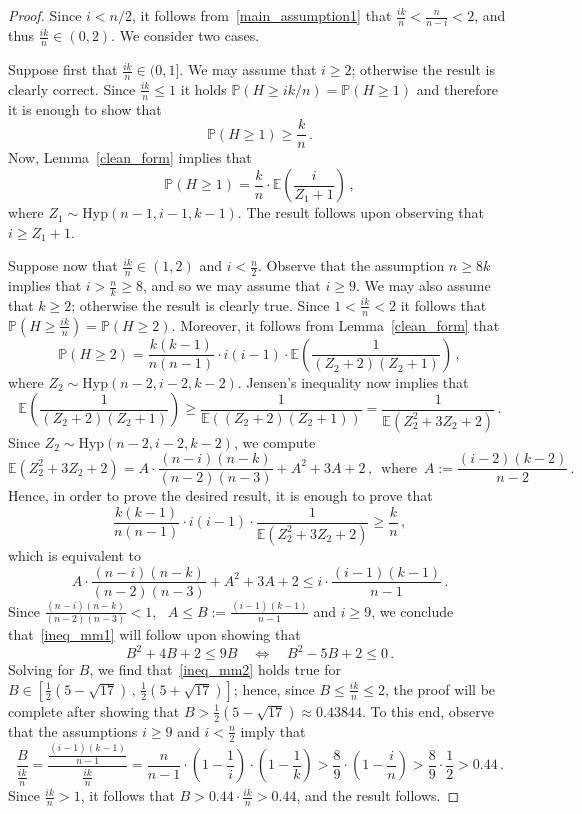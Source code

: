 \documentclass[10pt,a4paper]{amsart}
\begin{document}
\begin{proof}
Since $i<n/2$, it follows from~\eqref{main_assumption1}  that $\frac{ik}{n} < \frac{n}{n-i} < 2$, and thus $\frac{ik}{n}\in (0,2)$. 
We consider two cases. 

Suppose first that $\frac{ik}{n} \in (0,1]$.  
We may assume that $i\ge 2$; otherwise the result is clearly correct. 
Since $\frac{ik}{n} \le 1$ it holds $\mathbb{P}(H \ge ik/n) =\mathbb{P}(H \ge 1)$ 
and therefore it is enough to show that
\[
\mathbb{P}(H\ge 1)\ge \frac{k}{n} \, .
\] 
Now, Lemma~\ref{clean_form} implies that 
\[
\mathbb{P}(H\ge 1)=\frac{k}{n} \cdot \mathbb{E}\left(\frac{i}{Z_1 + 1}\right)   \, , 
\]
where $Z_1\sim\text{Hyp}(n-1,i-1,k-1)$.   The result follows upon observing that $i\ge Z_1+1$. 

Suppose now that $\frac{ik}{n} \in (1,2)$ and $i<\frac{n}{2}$. 
Observe that the assumption $n\ge 8k$ implies that $i> \frac{n}{k} \ge 8$, and so we may assume that $i\ge 9$. 
We may also assume that $k\ge 2$; otherwise the result is clearly true. 
Since $1<\frac{ik}{n} < 2$ it follows that 
$\mathbb{P}(H \ge \frac{ik}{n})=\mathbb{P}(H\ge 2)$. 
Moreover, it follows from Lemma~\ref{clean_form} that 
\[
\mathbb{P}(H\ge 2) = \frac{k(k-1)}{n(n-1)} \cdot i(i-1)\cdot \mathbb{E}\left(\frac{1}{(Z_2+2)(Z_2+1)}\right) \, ,
\]
where $Z_2\sim\text{Hyp}(n-2,i-2,k-2)$. 
Jensen's inequality now implies that 
\[
\mathbb{E}\left(\frac{1}{(Z_2+2)(Z_2+1)}\right) \ge 
\frac{1}{\mathbb{E}((Z_2+2)(Z_2+1))} = \frac{1}{\mathbb{E}(Z_2^2+3Z_2 +2)} \, .
\]
Since $Z_2\sim\text{Hyp}(n-2,i-2,k-2)$, we compute 
\[
\mathbb{E}(Z_2^2+3Z_2 +2) = A \cdot 
\frac{(n-i)(n-k)}{(n-2)(n-3)} + A^2 + 3A + 2 \, , \, \text{ where } \, A := \frac{(i-2)(k-2)}{n-2} \, .
\]
Hence, in order to prove the desired result, it is enough to prove that 
\[
\frac{k(k-1)}{n(n-1)} \cdot i(i-1)\cdot \frac{1}{\mathbb{E}(Z_2^2+3Z_2 +2)} \ge \frac{k}{n} \, ,
\]
which is equivalent to
\begin{equation}\label{ineq_mm1}
A \cdot 
\frac{(n-i)(n-k)}{(n-2)(n-3)} + A^2 + 3A + 2 \le i\cdot \frac{(i-1)(k-1)}{n-1} \, .
\end{equation}
Since $\frac{(n-i)(n-k)}{(n-2)(n-3)}<1$, \, $A\le B:=\frac{(i-1)(k-1)}{n-1}$ and $i\ge 9$, we conclude that~\eqref{ineq_mm1} will follow upon showing that 
\begin{equation}\label{ineq_mm2}
B^2 +4B + 2 \le 9B \quad \Longleftrightarrow\quad B^2-5B+2 \le 0 \, .
\end{equation}
Solving for $B$, we find that~\eqref{ineq_mm2} holds true for $B\in \left[\frac{1}{2}(5-\sqrt{17})\, ,\, \frac{1}{2}(5+\sqrt{17})\right]$; hence, since $B\le \frac{ik}{n}\le 2$, the proof will be complete after showing that $B > \frac{1}{2}(5-\sqrt{17})\approx 0.43844$. 
To this end, observe that the assumptions $i\ge 9$ and $i<\frac{n}{2}$ imply that 
\[
\frac{B}{\frac{ik}{n}}=\frac{\frac{(i-1)(k-1)}{n-1}}{\frac{ik}{n}} = \frac{n}{n-1} \cdot \left(1-\frac{1}{i}\right)\cdot \left(1-\frac{1}{k}\right) > \frac{8}{9}\cdot \left(1-\frac{i}{n}\right) >\frac{8}{9}\cdot\frac{1}{2} > 0.44 \, .
\]
Since  $\frac{ik}{n}>1$, it follows that $B > 0.44 \cdot \frac{ik}{n} > 0.44$,  and the result follows. 
\end{proof}
\end{document}
